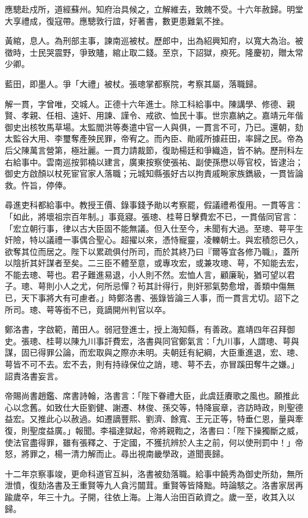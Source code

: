 \begin{pinyinscope}
應驄赴戍所，道經蘇州。知府治具候之，立解維去，致餽不受。十六年赦歸。明堂大享禮成，復寇帶。應驄敦行誼，好著書，數更患難氣不挫。

黃綰，息人。為刑部主事，諫南巡被杖。歷郎中，出為紹興知府，以寬大為治。被徵時，士民哭震野，爭致贐，綰止取二錢。至京，下詔獄，瘐死。隆慶初，贈太常少卿。

藍田，即墨人。爭「大禮」被杖。張璁掌都察院，考察其屬，落職歸。

解一貫，字曾唯，交城人。正德十六年進士。除工科給事中。陳講學、修德、親賢、孝親、任相、遠奸、用諫、謹令、戒欲、恤民十事。世宗嘉納之。嘉靖元年偕御史出核牧馬草場。太監閻洪等奏遣中官一人與俱，一貫言不可，乃已。還朝，劾太監谷大用、李璽奪產殃民罪，帝宥之。而內臣、勛戚所據莊田，率歸之民。帝為后父陳萬言營第，極壯麗。一貫力請裁節，復助楊廷和爭織造，皆不納。歷刑科左右給事中。雲南巡按郭楠以建言，廣東按察使張祐、副使孫懋以辱官校，皆逮治；御史方啟顏以杖死宦官家人落職；元城知縣張好古以拘責戚畹家族鐫級，一貫皆論救。忤旨，停俸。

尋進吏科都給事中。教授王價、錄事錢予勛以考察罷，假議禮希復用。一貫等言：「如此，將壞祖宗百年制。」事竟寢。張璁、桂萼日擊費宏不已，一貫偕同官言：「宏立朝行事，律以古大臣固不能無議。但入仕至今，未聞有大過。至璁、萼平生奸險，特以議禮一事偶合聖心。超擢以來，憑恃寵靈，凌轢朝士。與宏積怨已久，欲奪其位而居之。陛下以累疏俱付所司，而於其終乃曰『爾等宜各修乃職』，蓋所以陰折其奸謀者至矣。二三臣不體至意，或專攻宏，或兼攻璁、萼，不知能去宏，不能去璁、萼也。君子難進易退，小人則不然。宏恤人言，顧廉恥，猶可望以君子。璁、萼則小人之尤，何所忌憚？茍其計得行，則奸邪氣勢愈增，善類中傷無已，天下事將大有可慮者。」時鄭洛書、張錄皆論三人事，而一貫言尤切。詔下之所司。璁、萼等銜不已，竟謫開州判官以卒。

鄭洛書，字啟範，莆田人。弱冠登進士，授上海知縣，有善政。嘉靖四年召拜御史。張璁、桂萼以陳九川事訐費宏，洛書與同官鄭氣言：「九川事，人謂璁、萼與謀，固已得罪公論，而宏取與之際亦未明。夫朝廷有紀綱，大臣重進退，宏、璁、萼皆不可不去。宏不去，則有持祿保位之誚，璁、萼不去，亦冒蹊田奪牛之嫌。」詔責洛書妄言。

帝賜尚書趙鑑、席書詩翰，洛書言：「陛下眷禮大臣，此虞廷賡歌之風也。願推此心以念舊。如致仕大臣劉健、謝遷、林俊、孫交等，特降宸章，咨訪時政，則聖德益宏。又推此心以赦過。如遷謫豐熙、劉濟、餘寬、王元正等，特垂仁恩，量與牽復，則聖度益廣。」報聞。李福達獄起，帝將親鞫之，洛書曰：「陛下操獨斷之威，使法官盡得罪，雖有張釋之、于定國，不獲抗辨於人主之前，何以使刑罰中！」帝怒，將罪之，楊一清力解而止。尋出視南畿學政，道聞喪歸。

十二年京察事竣，更命科道官互糾，洛書被劾落職。給事中饒秀為御史所劾，無所泄憤，復劾洛書及王重賢等九人貪污闒茸。重賢等皆降黜。時論駭之。洛書家居再踰歲卒，年三十九。子開，往依上海。上海人治田百畝資之。歲一至，收其入以歸。


\end{pinyinscope}
